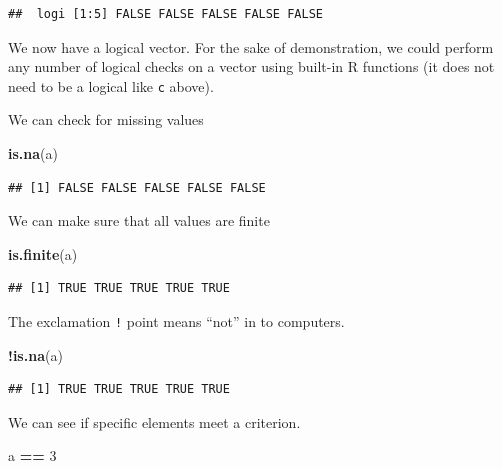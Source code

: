 \documentclass[
]{book}
\newenvironment{Shaded}{\begin{snugshade}}{\end{snugshade}}
\newcommand{\DecValTok}[1]{\textcolor[rgb]{0.00,0.00,0.81}{#1}}
\newcommand{\KeywordTok}[1]{\textcolor[rgb]{0.13,0.29,0.53}{\textbf{#1}}}
\newcommand{\NormalTok}[1]{#1}
\newcommand{\OperatorTok}[1]{\textcolor[rgb]{0.81,0.36,0.00}{\textbf{#1}}}
\newcommand{\StringTok}[1]{\textcolor[rgb]{0.31,0.60,0.02}{#1}}
\begin{document}
\begin{verbatim}
##  logi [1:5] FALSE FALSE FALSE FALSE FALSE
\end{verbatim}

We now have a logical vector. For the sake of demonstration, we could perform any number of logical checks on a vector using built-in R functions (it does not need to be a logical like \texttt{c} above).

We can check for missing values

\begin{Shaded}
\begin{Highlighting}[]
\KeywordTok{is.na}\NormalTok{(a)}
\end{Highlighting}
\end{Shaded}

\begin{verbatim}
## [1] FALSE FALSE FALSE FALSE FALSE
\end{verbatim}

We can make sure that all values are finite

\begin{Shaded}
\begin{Highlighting}[]
\KeywordTok{is.finite}\NormalTok{(a)}
\end{Highlighting}
\end{Shaded}

\begin{verbatim}
## [1] TRUE TRUE TRUE TRUE TRUE
\end{verbatim}

The exclamation \texttt{!} point means ``not'' in to computers.

\begin{Shaded}
\begin{Highlighting}[]
\OperatorTok{!}\KeywordTok{is.na}\NormalTok{(a)}
\end{Highlighting}
\end{Shaded}

\begin{verbatim}
## [1] TRUE TRUE TRUE TRUE TRUE
\end{verbatim}

We can see if specific elements meet a criterion.

\begin{Shaded}
\begin{Highlighting}[]
\NormalTok{a }\OperatorTok{==}\StringTok{ }\DecValTok{3}
\end{Highlighting}
\end{Shaded}
\end{document}
